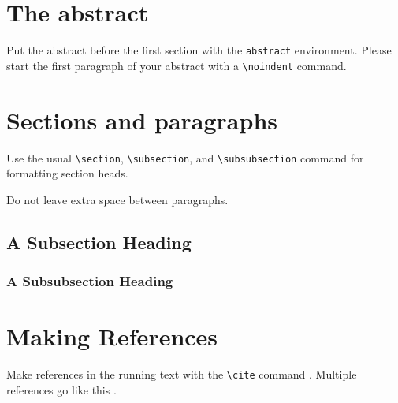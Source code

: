 \documentclass{article}
\begin{document}
\section{The abstract}

Put the abstract before the first section with the \verb+abstract+
environment. Please start the first paragraph of your abstract with a \verb+\noindent+ command.


\section{Sections and paragraphs}

  Use the usual \verb+\section+, \verb+\subsection+, and
  \verb+\subsubsection+ command for formatting section heads.

  Do not leave extra space between paragraphs.


  \subsection{A Subsection Heading}


  \subsubsection{A Subsubsection Heading}


  \section{Making References}

  Make references in the running text with the \verb+\cite+
  command \cite{dijkstra68}. Multiple references go like this
  \cite{charniak85,steels98}.




\end{document}
